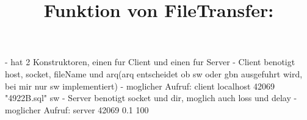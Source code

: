 \documentclass [12pt]{article}
\begin{document}
\title{Funktion von FileTransfer:}
\maketitle
\newline\newline
- hat 2 Konstruktoren, einen fur Client und einen fur Server\newline
- Client benotigt host, socket, fileName und arq(arq entscheidet ob sw oder gbn ausgefuhrt wird, bei mir nur sw implementiert)\newline
- moglicher Aufruf: client localhost 42069 "4922B.sql" sw\newline
- Server benotigt socket und dir, moglich auch loss und delay\newline
- moglicher Aufruf: server 42069 0.1 100\newline
\end{document}
